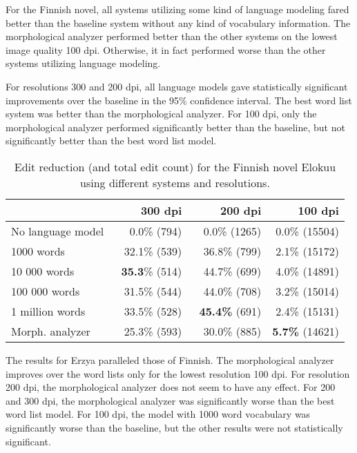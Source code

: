 \documentclass[b5paper]{article}
\begin{document}
For the Finnish novel, all systems utilizing some kind of language
modeling fared better than the baseline system without any kind of
vocabulary information. The morphological analyzer performed better
than the other systems on the lowest image quality 100 dpi. Otherwise,
it in fact performed worse than the other systems utilizing language
modeling.

For resolutions 300 and 200 dpi, all language models gave
statistically significant improvements over the baseline in the 95\%
confidence interval. The best word list system was better than the
morphological analyzer. For 100 dpi, only the morphological analyzer
performed significantly better than the baseline, but not
significantly better than the best word list model.

\begin{table}[!htb]
\begin{center}
\begin{tabular}{lrrr}
\hline 
                  & 300 dpi & 200 dpi & 100 dpi \\
\hline 
No language model & ~0.0\% (794)          & ~0.0\% (1265)          & 0.0\% (15504)  \\
1000 words        & ~32.1\% (539)  & ~36.8\% (799)        & 2.1\% (15172)           \\
10 000 words      & {\bf ~35.3}\% (514)  & ~44.7\%  (699)  & 4.0\% (14891)          \\
100 000 words     & ~31.5\% (544)   & ~44.0\%  (708)  & 3.2\%  (15014)              \\
1 million words   & ~33.5\% (528)   & {\bf ~45.4\%} (691)  & 2.4\% (15131)          \\
Morph. analyzer   & ~25.3\% (593)    & ~30.0\% (885)     & {\bf 5.7\%} (14621)      \\
\hline 
\end{tabular}
\caption{Edit reduction (and total edit count) for the Finnish novel Elokuu using different systems and resolutions.}\label{fin-novel-res}
\end{center}
\end{table}

The results for Erzya paralleled those of Finnish. The morphological
analyzer improves over the word lists only for the lowest resolution
100 dpi. For resolution 200 dpi, the morphological analyzer does not
seem to have any effect. For 200 and 300 dpi, the morphological
analyzer was significantly worse than the best word list model. For
100 dpi, the model with 1000 word vocabulary was significantly worse
than the baseline, but the other results were not statistically
significant.
\end{document}
